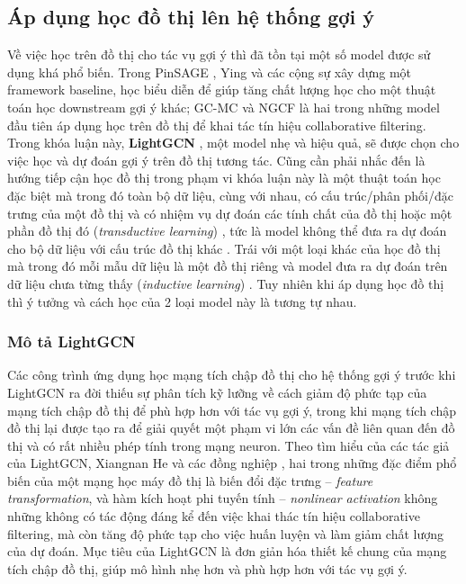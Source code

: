 \subsection{Áp dụng học đồ thị lên hệ thống gợi ý} \label{3.2.3-GNN-on-rec}

\noindent Về việc học trên đồ thị cho tác vụ gợi ý thì đã tồn tại một số model \cite{PinSAGE, GC-MC, NGCF, LightGCN} được sử dụng khá phổ biến. Trong PinSAGE \cite{PinSAGE}, Ying và các cộng sự xây dựng một framework baseline, học biểu diễn để giúp tăng chất lượng học cho một thuật toán học downstream gợi ý khác; GC-MC \cite{GC-MC} và NGCF \cite{NGCF} là hai trong những model đầu tiên áp dụng học trên đồ thị để khai tác tín hiệu collaborative filtering. Trong khóa luận này, \textbf{LightGCN} \cite{LightGCN}, một model nhẹ và hiệu quả, sẽ được chọn cho việc học và dự đoán gợi ý trên đồ thị tương tác. Cũng cần phải nhắc đến là hướng tiếp cận học đồ thị trong phạm vi khóa luận này là một thuật toán học đặc biệt mà trong đó toàn bộ dữ liệu, cùng với nhau, có cấu trúc/phân phối/đặc trưng của một đồ thị và có nhiệm vụ dự đoán các tính chất của đồ thị hoặc một phần đồ thị đó (\textit{transductive learning}) \cite{GCN-model, DGCN, NGCF}, tức là model không thể đưa ra dự đoán cho bộ dữ liệu với cấu trúc đồ thị khác \cite{review:GNN}. Trái với một loại khác của học đồ thị mà trong đó mỗi mẫu dữ liệu là một đồ thị riêng và model đưa ra dự đoán trên dữ liệu chưa từng thấy (\textit{inductive learning}) \cite{GraphSAGE, PinSAGE, GC-model, GG-NN}. Tuy nhiên khi áp dụng học đồ thị thì ý tưởng và cách học của 2 loại model này là tương tự nhau.

\subsubsection{Mô tả LightGCN}

\noindent Các công trình ứng dụng học mạng tích chập đồ thị cho hệ thống gợi ý trước khi LightGCN ra đời thiếu sự phân tích kỹ lưỡng về cách giảm độ phức tạp của mạng tích chập đồ thị để phù hợp hơn với tác vụ gợi ý, trong khi mạng tích chập đồ thị lại được tạo ra để giải quyết một phạm vi lớn các vấn đề liên quan đến đồ thị và có rất nhiều phép tính trong mạng neuron. Theo tìm hiểu của các tác giả của LightGCN, Xiangnan He và các đồng nghiệp \cite{LightGCN}, hai trong những đặc điểm phổ biến của một mạng học máy đồ thị là biến đổi đặc trưng -- \textit{feature transformation}, và hàm kích hoạt phi tuyến tính -- \textit{nonlinear activation} không những không có tác động đáng kể đến việc khai thác tín hiệu collaborative filtering, mà còn tăng độ phức tạp cho việc huấn luyện và làm giảm chất lượng của dự đoán. Mục tiêu của LightGCN là đơn giản hóa thiết kế chung của mạng tích chập đồ thị, giúp mô hình nhẹ hơn và phù hợp hơn với tác vụ gợi ý.

